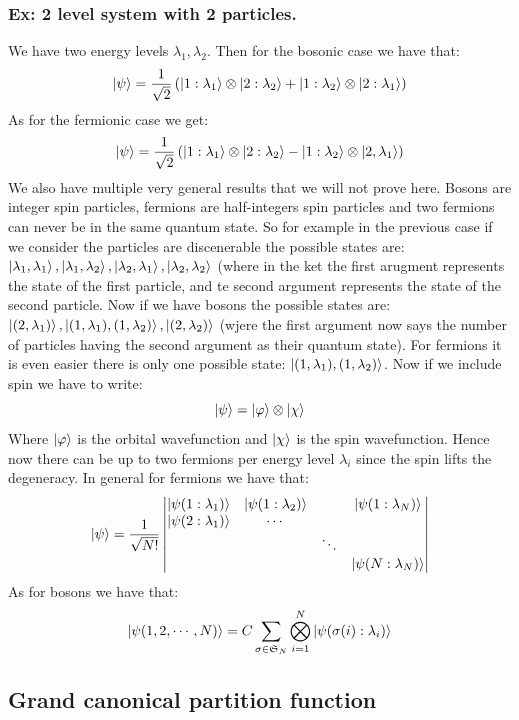 \documentclass[10pt,a4paper]{book}
\begin{document}
\subsubsection{Ex: 2 level system with 2 particles.}
We have two energy levels $\lambda_1, \lambda_2$. Then for the bosonic case we have that:
\[
\ket \psi = \frac{1}{\sqrt{2}} \left(\ket{1:\lambda_1} \otimes \ket{2 : \lambda_2} + \ket{1 : \lambda_2} \otimes \ket{2 : \lambda_1}\right)
\]
As for the fermionic case we get:
\[
\ket \psi = \frac{1}{\sqrt{2}} \left( \ket{1: \lambda_1} \otimes \ket{2: \lambda_2} - \ket{1 : \lambda_2} \otimes \ket{2, \lambda_1}\right)
\]
We also have multiple very general results that we will not prove here. Bosons are integer spin particles, fermions are half-integers spin particles and two fermions can never be in the same quantum state. So for example in the previous case if we consider the particles are discenerable the possible states are: $\ket{\lambda_1, \lambda_1}, \ket{\lambda_1, \lambda_2}, \ket{\lambda_2, \lambda_1}, \ket{\lambda_2, \lambda_2}$ (where in the ket the first arugment represents the state of the first particle, and te second argument represents the state of the second particle. Now if we have bosons the possible states are: $\ket{(2, \lambda_1)}, \ket{(1, \lambda_1), (1, \lambda_2)}, \ket{(2, \lambda_2)}$ (wjere the first argument now says the number of particles having the second argument as their quantum state). For fermions it is even easier there is only one possible state: $\ket{(1, \lambda_1), (1, \lambda_2)}$. Now if we include spin we have to write:
\[
\ket \psi = \ket \varphi \otimes \ket \chi
\]
Where $\ket \varphi$ is the orbital wavefunction and $\ket \chi$ is the spin wavefunction. Hence now there can be up to two fermions per energy level $\lambda_i$ since the spin lifts the degeneracy. In general for fermions we have that:
\[
\ket \psi = \frac{1}{\sqrt{N!}} \begin{vmatrix}
\ket{\psi(1 :\lambda_1)} & \ket{\psi(1 : \lambda_2)} & & \ket{\psi(1:\lambda_N)}\\
\ket{\psi(2 :\lambda_1)} & \cdots & & \\
 & & \ddots & \\
  & & & \ket{\psi(N:\lambda_N)} \\
\end{vmatrix}
\]
As for bosons we have that:
\[
\ket{\psi(1,2, \cdots, N)} = C \sum_{\sigma \in \mathfrak{S}_N} \bigotimes_{i = 1}^N \ket{\psi(\sigma(i) : \lambda_i)}
\]

\subsection{Grand canonical partition function}
\end{document}
